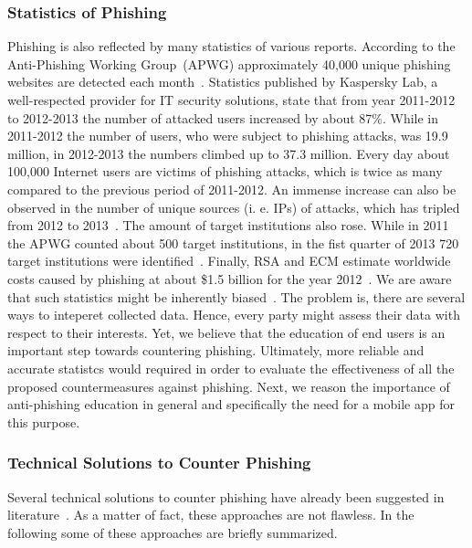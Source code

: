 \subsubsection{Statistics of Phishing}
\label{s:stats}
Phishing is also reflected by many statistics of various reports. 
 According to the Anti-Phishing Working Group~(APWG) approximately 40,000 unique phishing websites are detected each month~\cite{antiphishingtrendreport2013}. Statistics published by Kaspersky Lab, a well-respected provider for IT security solutions, state that from year 2011-2012 to 2012-2013 the number of attacked users increased by about 87\%. While in 2011-2012 the number of users, who were subject to phishing attacks, was 19.9 million, in 2012-2013 the numbers climbed up to 37.3 million. 
 Every day about 100,000 Internet users are victims of phishing attacks, which is twice as many compared to the previous period of 2011-2012. An immense increase can also be observed in the number of unique sources (i.
e. 
 IPs) of attacks, which has tripled from 2012 to 2013~\cite{kasperskyreport2013}. The amount of target institutions also rose. 
 While in 2011 the APWG counted about 500 target institutions, in the fist quarter of 2013 720 target institutions were identified~\cite{antiphishingglobalreport2013}. 
Finally, RSA and ECM estimate worldwide costs caused by phishing at about \$1.5 billion for the year 2012~\cite{rsa2013}. 
We are aware that such statistics might be inherently biased~\cite{moore2010hard}. 
The problem is, there are several ways to inteperet collected data. 
Hence, every party might assess their data with respect to their interests. 
Yet, we believe that the education of end users is an important step towards countering phishing. 
Ultimately, more reliable and accurate statistcs would required in order to evaluate the effectiveness of all the proposed countermeasures against phishing. 
Next, we reason the importance of anti-phishing education in general and specifically the need for a mobile app for this purpose.

\subsubsection{Technical Solutions to Counter Phishing}

Several technical solutions to counter phishing have already been suggested in literature~\cite{purkait2012phishing}. 
As a matter of fact, these approaches are not flawless. 
In the following some of these approaches are briefly summarized.

